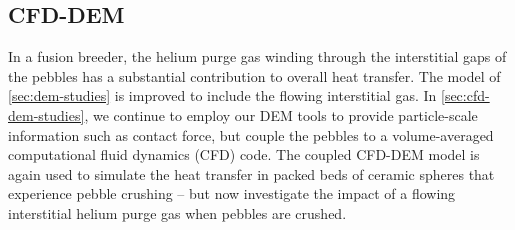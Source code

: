 \subsection{CFD-DEM}
In a fusion breeder, the helium purge gas winding through the interstitial gaps of the pebbles has a substantial contribution to overall heat transfer.\cite{Reimann:2002mi,Abou-Sena2005} The model of \cref{sec:dem-studies} is improved to include the flowing interstitial gas. In \cref{sec:cfd-dem-studies}, we continue to employ our DEM tools to provide particle-scale information such as contact force, but couple the pebbles to a volume-averaged computational fluid dynamics (CFD) code. The coupled CFD-DEM model is again used to simulate the heat transfer in packed beds of ceramic spheres that experience pebble crushing -- but now investigate the impact of a flowing interstitial helium purge gas when pebbles are crushed.



